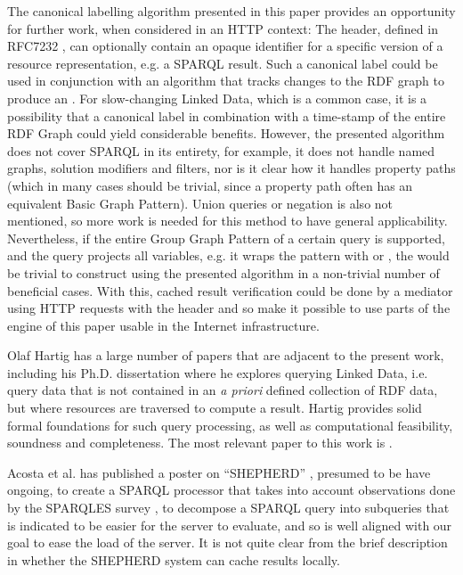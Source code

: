 The canonical labelling algorithm presented in this paper provides an
opportunity for further work, when considered in an HTTP context: The
 header, defined in RFC7232 \cite{rfc7232}, can optionally
contain an opaque identifier for a specific version of a resource
representation, e.g. a SPARQL result. Such a canonical label could be
used in conjunction with an algorithm that tracks changes to the RDF
graph to produce an . For slow-changing Linked Data, which
is a common case, it is a possibility that a canonical label in
combination with a time-stamp of the entire RDF Graph could yield
considerable benefits. However, the presented algorithm does not cover
SPARQL in its entirety, for example, it does not handle named graphs,
solution modifiers and filters, nor is it clear how it handles
property paths (which in many cases should be trivial, since a
property path often has an equivalent Basic Graph Pattern). Union
queries or negation is also not mentioned, so more work is needed for
this method to have general applicability. Nevertheless, if the entire
Group Graph Pattern of a certain query is supported, and the query
projects all variables, e.g. it wraps the pattern with  or , the  would be trivial to
construct using the presented algorithm in a non-trivial number of
beneficial cases. With this, cached result verification could be done
by a mediator using HTTP requests with the 
header and so make it possible to use parts of the engine of this
paper usable in the Internet infrastructure.

Olaf Hartig has a large number of papers that are adjacent to the
present work, including his Ph.D. dissertation \cite{hartig2014querying} where he
explores querying Linked Data, i.e. query data that is not contained
in an \textit{a priori} defined collection of RDF data, but where resources
are traversed to compute a result. Hartig provides solid formal
foundations for such query processing, as well as computational
feasibility, soundness and completeness. The most relevant paper to
this work is \cite{hartig2011caching}.

Acosta et al. has published a poster on ``SHEPHERD''
\cite{acosta2014shepherd}, presumed to be have ongoing, to
create a SPARQL processor that takes into account observations done by
the SPARQLES survey \cite{buil2013sparql}, to decompose a SPARQL query into
subqueries that is indicated to be easier for the server to evaluate,
and so is well aligned with our goal to ease the load of the
server. It is not quite clear from the brief description in 
\cite{acosta2014shepherd} whether the SHEPHERD system can cache results locally.

